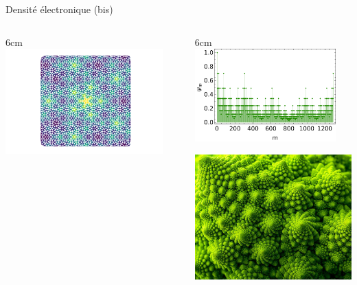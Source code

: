 \documentclass[xcolor=x11names,compress,professionalfonts]{beamer}
\renewcommand{\(}{\begin{columns}}
\renewcommand{\)}{\end{columns}}
\newcommand{\<}[1]{\begin{column}{#1}}
\renewcommand{\>}{\end{column}}
\begin{document}
\begin{frame}{Densité électronique (bis)}
\(
\<{6cm}
\centering
\includegraphics[width=0.9\textwidth]{img/electronic_density.pdf}
\>
\<{6cm}
\centering
\includegraphics[width=0.9\textwidth]{img/wf.pdf}%

\includegraphics[width=.8\textwidth]{img/chou_romanesco.jpg}
\>
\)
\end{frame}
\end{document}
